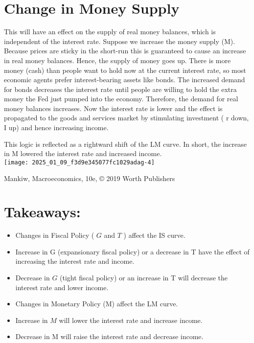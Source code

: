 \documentclass[10pt]{article}
\begin{document}
\section*{Change in Money Supply}
This will have an effect on the supply of real money balances, which is independent of the interest rate. Suppose we increase the money supply (M). Because prices are sticky in the short-run this is guaranteed to cause an increase in real money balances. Hence, the supply of money goes up. There is more money (cash) than people want to hold now at the current interest rate, so most economic agents prefer interest-bearing assets like bonds. The increased demand for bonds decreases the interest rate until people are willing to hold the extra money the Fed just pumped into the economy. Therefore, the demand for real money balances increases. Now the interest rate is lower and the effect is propagated to the goods and services market by stimulating investment ( r down, I up) and hence increasing income.

This logic is reflected as a rightward shift of the LM curve. In short, the increase in M lowered the interest rate and increased income.\\
\texttt{[image: 2025\_01\_09\_f3d9e345077fc1029adag-4]}

Mankiw, Macroeconomics, 10e, © 2019 Worth Publishers

\section*{Takeaways:}
\begin{itemize}
  \item Changes in Fiscal Policy ( $G$ and $T$ ) affect the IS curve.
  \item Increase in G (expansionary fiscal policy) or a decrease in T have the effect of increasing the interest rate and income.
  \item Decrease in $G$ (tight fiscal policy) or an increase in T will decrease the interest rate and lower income.
  \item Changes in Monetary Policy (M) affect the LM curve.
  \item Increase in $M$ will lower the interest rate and increase income.
  \item Decrease in M will raise the interest rate and decrease income.
\end{itemize}
\end{document}
